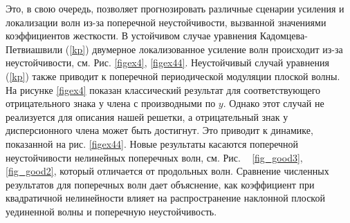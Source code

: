 Это, в свою очередь, позволяет прогнозировать различные сценарии усиления и локализации волн из-за поперечной неустойчивости, вызванной значениями коэффициентов жесткости. В устойчивом случае уравнения Кадомцева-Петвиашвили (\ref {kp}) двумерное локализованное усиление волн происходит из-за неустойчивости, см. Рис. \ref {figex4}, \ref {figex44}. Неустойчивый случай уравнения (\ref {kp}) также приводит к поперечной периодической модуляции плоской волны. На рисунке \ref {figex4} показан классический результат для соответствующего отрицательного знака у члена с производными по $ y $. Однако этот случай не реализуется для описания нашей решетки, а отрицательный знак у дисперсионного члена может быть достигнут. Это приводит к динамике, показанной на рис. \ref{figex44}. Новые результаты касаются поперечной неустойчивости нелинейных поперечных волн, см. Рис. ~ \ref {fig_good3}, \ref{fig_good2}, который отличается от продольных волн. Сравнение численных результатов для поперечных волн дает объяснение, как коэффициент при квадратичной нелинейности влияет на распространение наклонной плоской уединенной волны и поперечную неустойчивость.
